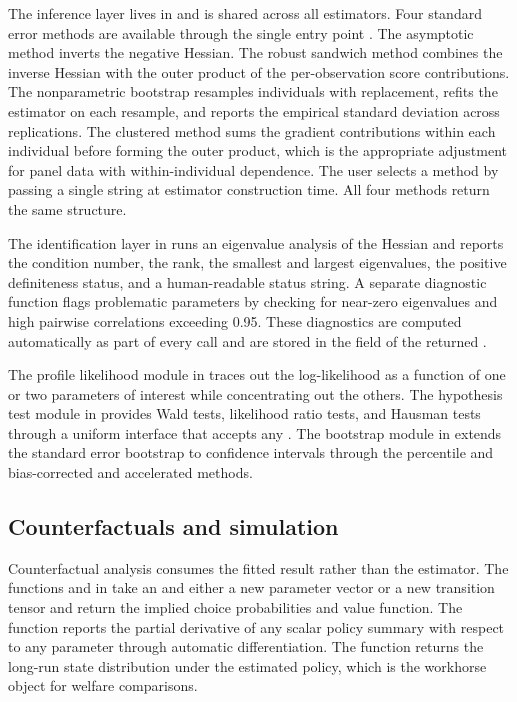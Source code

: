 The inference layer lives in  and is shared across all estimators. Four standard error methods are available through the single entry point . The asymptotic method inverts the negative Hessian. The robust sandwich method combines the inverse Hessian with the outer product of the per-observation score contributions. The nonparametric bootstrap resamples individuals with replacement, refits the estimator on each resample, and reports the empirical standard deviation across replications. The clustered method sums the gradient contributions within each individual before forming the outer product, which is the appropriate adjustment for panel data with within-individual dependence. The user selects a method by passing a single string at estimator construction time. All four methods return the same  structure.

The identification layer in  runs an eigenvalue analysis of the Hessian and reports the condition number, the rank, the smallest and largest eigenvalues, the positive definiteness status, and a human-readable status string. A separate diagnostic function  flags problematic parameters by checking for near-zero eigenvalues and high pairwise correlations exceeding 0.95. These diagnostics are computed automatically as part of every  call and are stored in the  field of the returned .

The profile likelihood module in  traces out the log-likelihood as a function of one or two parameters of interest while concentrating out the others. The hypothesis test module in  provides Wald tests, likelihood ratio tests, and Hausman tests through a uniform interface that accepts any . The bootstrap module in  extends the standard error bootstrap to confidence intervals through the percentile and bias-corrected and accelerated methods.

\subsection{Counterfactuals and simulation}

Counterfactual analysis consumes the fitted result rather than the estimator. The functions  and  in  take an  and either a new parameter vector or a new transition tensor and return the implied choice probabilities and value function. The  function reports the partial derivative of any scalar policy summary with respect to any parameter through automatic differentiation. The  function returns the long-run state distribution under the estimated policy, which is the workhorse object for welfare comparisons.

